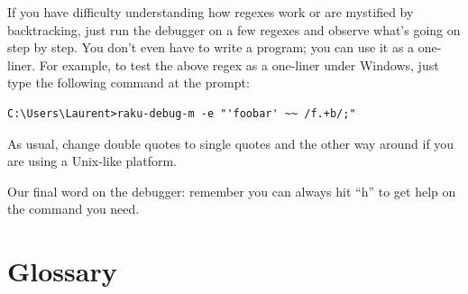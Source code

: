 If you have difficulty understanding how regexes work or are 
mystified by backtracking, just run the debugger on a few 
regexes and observe what's going on step by step. You don't 
even have to write a program; you can use it as a one-liner. 
For example, to test the above regex as a one-liner under  
Windows, just type the following command at the prompt:

\begin{verbatim}
C:\Users\Laurent>raku-debug-m -e "'foobar' ~~ /f.+b/;"
\end{verbatim}

As usual, change double quotes to single quotes and the other 
way around if you are using a Unix-like platform.

Our final word on the debugger: remember you can always hit 
``h'' to get help on the command you need. 


\section{Glossary}

